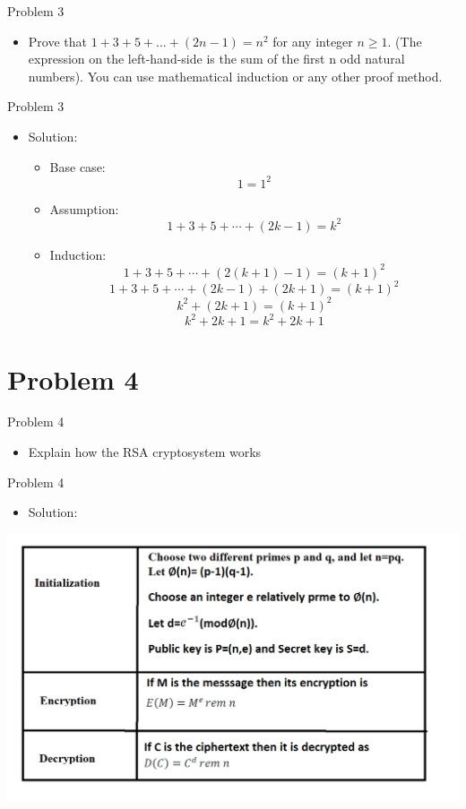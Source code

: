 \documentclass{beamer}
\begin{document}
\begin{frame}{Problem 3}
   \begin{itemize}
          \item Prove that $1+3+5+...+(2n-1)=n^2$ for any integer $n \geq 1$. (The expression on the left-hand-side is the sum of the first n odd natural numbers). You can use mathematical induction or any other proof method.
      \end{itemize}
\end{frame}
\begin{frame}{Problem 3}
   \begin{itemize}
        \item Solution:
        \begin{itemize}
            \item Base case: $$1 = 1^2$$
            \item Assumption: $$1 + 3 + 5 + \cdots + (2k - 1) = k^2$$
            \item Induction:    $$1 + 3 + 5 + \cdots + (2(k + 1) - 1) = (k + 1)^2$$
                                $$1 + 3 + 5 + \cdots + (2k - 1) + (2k + 1) = (k + 1)^2$$
                                $$k^2 + (2k + 1) = (k + 1)^2$$
                                $$k^2 + 2k + 1 = k^2 + 2k + 1$$
        \end{itemize}
    \end{itemize}
\end{frame}

\section{Problem 4}

\begin{frame}{Problem 4}
    \begin{itemize}
        \item Explain how the RSA cryptosystem works
    \end{itemize}
\end{frame}

\begin{frame}{Problem 4}
    \begin{itemize}
        \item Solution:
    \end{itemize}
    \centering \includegraphics[width=.7\linewidth]{p2.png} 
\end{frame}
\end{document}
